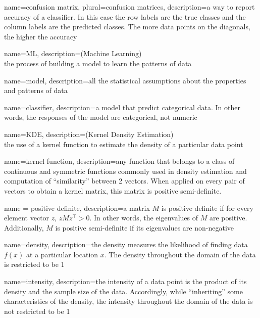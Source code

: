 {
        name=confusion matrix,
        plural=confusion matrices,
        description={a way to report accuracy of a classifier. In this case the row labels are the true classes and the column labels are the predicted classes. The more data points on the diagonals, the higher the accuracy}
}

{
        name=ML,
        description={(Machine Learning) \\ the process of building a model to learn the patterns of data}
}

{
        name=model,
        description={all the statistical assumptions about the properties and patterns of data}
}

{
        name=classifier,
        description={a model that predict categorical data. In other words, the responses of the model are categorical, not numeric}
}

{
        name=KDE,
        description={(Kernel Density Estimation) \\ the use of a kernel function to estimate the density of a particular data point}
}

{
        name=kernel function,
        description={any function that belongs to a class of continuous and symmetric functions commonly used in density estimation and computation of ``similarity'' between 2 vectors. When applied on every pair of vectors to obtain a kernel matrix, this matrix is positive semi-definite.}
}

{
        name = positive definite,
        description={a matrix $M$ is positive definite if for every element vector $z$, $zMz^\intercal > 0$. In other words, the eigenvalues of $M$ are positive. Additionally, $M$ is positive semi-definite if its eigenvalues are non-negative}
}

{
        name=density,
        description={the density measures the likelihood of finding data $f(x)$ at a particular location $x$. The density throughout the domain of the data is restricted to be 1}
}

{
        name=intensity,
        description={the intensity of a data point is the product of its density and the sample size of the data. Accordingly, while ``inheriting'' some characteristics of the density, the intensity throughout the domain of the data is not restricted to be 1}
}

